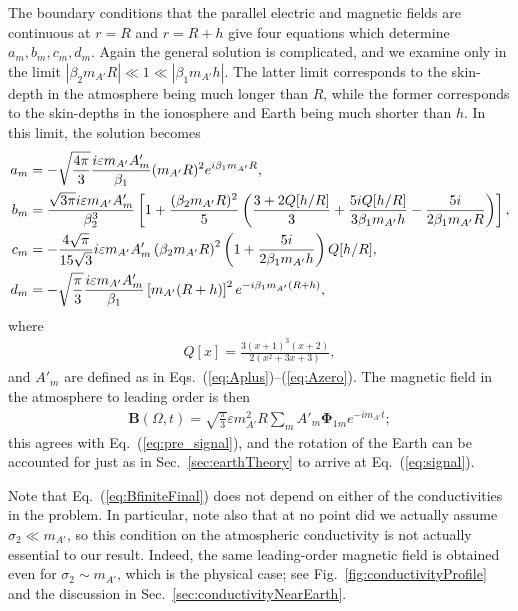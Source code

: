 \documentclass[amsmath,amssymb,aps,10pt,prd,letterpaper,nofootinbib,balancelastpage,notitlepage,superscriptaddress,twocolumn,floatfix]{revtex4-2}
\newcommand{\figref}[2][]{Fig{#1}.~\ref{#2}}		%
\newcommand{\secref}[2][]{Sec{#1}.~\ref{#2}}		%
\renewcommand{\eqref}[2][]{Eq{#1}.~(\ref{eq:#2})}	%
\newcommand{\eqrefRange}[2]{Eqs.~(\ref{eq:#1})--(\ref{eq:#2})}
\newcommand{\lb}{\ensuremath{\left}}					%
\newcommand{\rb}{\ensuremath{\right}}					%
\begin{document}
\begin{widetext}
The boundary conditions that the parallel electric and magnetic fields are continuous at $r=R$ and $r=R+h$ give four equations which determine $a_m,b_m,c_m,d_m$.
Again the general solution is complicated, and we examine only in the limit $|\beta_2m_{A'}R|\ll1\ll|\beta_1m_{A'}h|$.
The latter limit corresponds to the skin-depth in the atmosphere being much longer than $R$, while the former corresponds to the skin-depths in the ionosphere and Earth being much shorter than $h$.
In this limit, the solution becomes
\begin{align}
    a_m&=-\sqrt{\frac{4\pi}3}\frac{i\varepsilon m_{A'}A'_m}{\beta_1}(m_{A'}R)^2e^{i\beta_1m_{A'}R},\\
    b_m&=\frac{\sqrt{3\pi}i\varepsilon m_{A'}A'_m}{\beta_2^3}\lb[1+\frac{(\beta_2m_{A'}R)^2}5\lb(\frac{3+2Q[ h/R]}3+\frac{5iQ[h/R]}{3\beta_1m_{A'}h}-\frac{5i}{2\beta_1m_{A'}R}\rb)\rb],\\
    c_m&=-\frac{4\sqrt{\pi}}{15\sqrt{3}}i\varepsilon m_{A'}A'_m \lb(\beta_2m_{A'}R\rb)^2\lb(1+\frac{5i}{2\beta_1m_{A'}h}\rb)Q[h/R],\\
    d_m&=-\sqrt{\frac\pi3}\frac{i\varepsilon m_{A'}A'_m}{\beta_1}\lb[m_{A'}(R+h)\rb]^2e^{-i\beta_1m_{A'}(R+h)},
\end{align}
where
\begin{align}
    Q[x]=\frac{3(x+1)^3(x+2)}{2(x^2+3x+3)},
\end{align}
and $A'_m$ are defined as in \eqrefRange{Aplus}{Azero}.
The magnetic field in the atmosphere to leading order is then
\begin{align}
    \bm{B}(\Omega,t)=\sqrt{\frac\pi3}\varepsilon m_{A'}^2R\sum_mA'_m\bm{\Phi}_{1m}e^{-im_{A'}t};
    \label{eq:BfiniteFinal}
\end{align}
this agrees with \eqref{pre_signal}, and the rotation of the Earth can be accounted for just as in \secref{sec:earthTheory} to arrive at \eqref{signal}.
\end{widetext}

Note that \eqref{BfiniteFinal} does not depend on either of the conductivities in the problem.
In particular, note also that at no point did we actually assume $\sigma_2\ll m_{A'}$, so this condition on the atmospheric conductivity is not actually essential to our result.
Indeed, the same leading-order magnetic field is obtained even for $\sigma_2 \sim m_{A'}$, which is the physical case; see \figref{fig:conductivityProfile} and the discussion in \secref{sec:conductivityNearEarth}.
\end{document}
